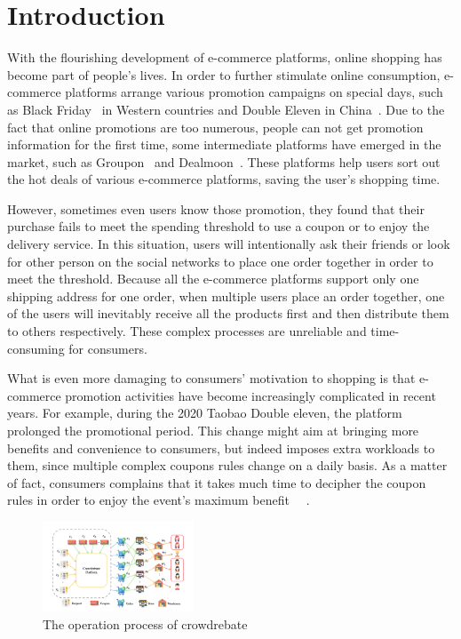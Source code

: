 \section{Introduction}

With the flourishing development of e-commerce platforms, online shopping has become part of people's lives. In order to further stimulate online consumption, e-commerce platforms arrange various promotion campaigns on special days, such as Black Friday~\cite{2013Black} in Western countries and Double Eleven in China~\cite{huang2019x}. Due to the fact that online promotions are too numerous, people can not get promotion information for the first time, some intermediate platforms have emerged in the market, such as Groupon~\cite{groupon} and Dealmoon~\cite{dealmoon}. These platforms help users sort out the hot deals of various e-commerce platforms, saving the user's shopping time.

However, sometimes even users know those promotion, they found that their purchase fails to meet the spending threshold to use a coupon or to enjoy the delivery service. In this situation, users will intentionally ask their friends or look for other person on the social networks to place one order together in order to meet the threshold. Because all the e-commerce platforms support only one shipping address for one order, when multiple users place an order together, one of the users will inevitably receive all the products first and then distribute them to others respectively. These complex processes are unreliable and time-consuming for consumers.

What is even more damaging to consumers' motivation to shopping is that e-commerce promotion activities have become increasingly complicated in recent years. For example, during the 2020 Taobao Double eleven, the platform prolonged the promotional period. This change might aim at bringing more benefits and convenience to consumers, but indeed imposes extra workloads to them, since multiple complex coupons rules change on a daily basis. As a matter of fact, consumers complains that it takes much time to decipher the coupon rules in order to enjoy the event's maximum benefit~\cite{2020} ~\cite{double11}.
\begin{figure}[t] 
\centering %
		\includegraphics[width=0.4\textwidth]{../figure/crowdrebate process.png} %
	\caption{The operation process of crowdrebate} %
	\label{fig:Crowdrebate} %
	\end{figure}

